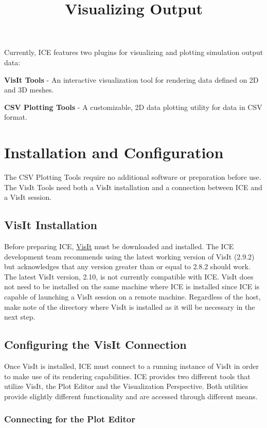 \documentclass{article}
\begin{document}
\title{Visualizing Output}

Currently, ICE features two plugins for visualizing and plotting simulation
output data:

\textbf{VisIt Tools} - An interactive visualization tool for rendering data
defined on 2D and 3D meshes.

\textbf{CSV Plotting Tools} - A customizable, 2D data plotting utility for data
in CSV format.

\section{Installation and Configuration}

The CSV Plotting Tools require no additional software or preparation before use.
The VisIt Tools need both a VisIt installation and a connection between ICE and
a VisIt session.

\subsection{VisIt Installation} 

Before preparing ICE,
\href{https://wci.llnl.gov/simulation/computer-codes/visit/}{VisIt} must be
downloaded and installed. The ICE development team recommends using the latest
working version of VisIt (2.9.2) but acknowledges that any version greater than 
or equal to 2.8.2 should work. The latest VisIt version, 2.10, is not currently 
compatible with ICE. VisIt does not need to be installed on the same machine 
where ICE is installed since ICE is capable of launching a VisIt session on a 
remote machine. Regardless of the host, make note of the directory where VisIt 
is installed as it will be necessary in the next step.

\subsection{Configuring the VisIt Connection}

Once VisIt is installed, ICE must connect to a running instance of VisIt in
order to make use of its rendering capabilities. ICE provides two different
tools that utilize VisIt, the Plot Editor and the Visualization Perspective.
Both utilities provide slightly different functionality and are accessed
through different means.

\subsubsection{Connecting for the Plot Editor} 
\end{document}
